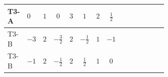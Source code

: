 \documentclass[8pt]{article}
\begin{document}
\begin{landscape}
\begin{longtable}{@{}llcccccc >{\raggedright\arraybackslash}p{0.21\linewidth} >{\raggedright\arraybackslash}p{0.21\linewidth} >{\raggedright\arraybackslash}p{0.21\linewidth}@{}}
\midrule
T3-A & $0$ & $1$ & $0$ & $3$ & $1$ & $2$ & $\frac{1}{2}$ & \scriptsize\adjustbox{max width=\linewidth}{$\begin{gathered} -\frac{3}{2} (\left({Y_d}\,\left({Y_d}\right)^{\dagger}\,{Y_u}\right)_{ij}-\left({Y_u}\,\left({Y_u}\right)^{\dagger}\,{Y_u}\right)_{ij})\end{gathered}$} & \scriptsize\adjustbox{max width=\linewidth}{$\begin{gathered} -\frac{9}{4} {g_2}^2 \left({Y_u}\right)_{ij}\end{gathered}$} & \scriptsize\adjustbox{max width=\linewidth}{$\begin{gathered} -8 {g_3}^2 \left({Y_u}\right)_{ij}\end{gathered}$} \\
\midrule
T3-B & $-3$ & $2$ & $-\frac{3}{2}$ & $2$ & $-\frac{1}{2}$ & $1$ & $-1$ & \scriptsize\adjustbox{max width=\linewidth}{$\begin{gathered} -\frac{3}{2} (\left({Y_d}\,\left({Y_d}\right)^{\dagger}\,{Y_u}\right)_{ij}-\left({Y_u}\,\left({Y_u}\right)^{\dagger}\,{Y_u}\right)_{ij})\end{gathered}$} & \scriptsize\adjustbox{max width=\linewidth}{$\begin{gathered} -\frac{9}{4} {g_2}^2 \left({Y_u}\right)_{ij}\end{gathered}$} & \scriptsize\adjustbox{max width=\linewidth}{$\begin{gathered} -8 {g_3}^2 \left({Y_u}\right)_{ij}\end{gathered}$} \\
\midrule
T3-B & $-1$ & $2$ & $-\frac{1}{2}$ & $2$ & $\frac{1}{2}$ & $1$ & $0$ & \scriptsize\adjustbox{max width=\linewidth}{$\begin{gathered} -\frac{3}{2} (\left({Y_d}\,\left({Y_d}\right)^{\dagger}\,{Y_u}\right)_{ij}-\left({Y_u}\,\left({Y_u}\right)^{\dagger}\,{Y_u}\right)_{ij})\end{gathered}$} & \scriptsize\adjustbox{max width=\linewidth}{$\begin{gathered} -\frac{9}{4} {g_2}^2 \left({Y_u}\right)_{ij}\end{gathered}$} & \scriptsize\adjustbox{max width=\linewidth}{$\begin{gathered} -8 {g_3}^2 \left({Y_u}\right)_{ij}\end{gathered}$} \\
\midrule

\end{longtable}
\end{landscape}
\end{document}
